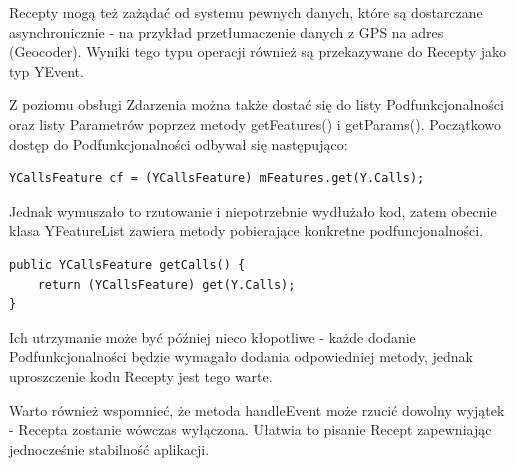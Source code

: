 \documentclass[11pt,a4paper,polish,thesis]{dcsbook}
\begin{document}
Recepty mogą też zażądać od systemu pewnych danych, które są dostarczane asynchronicznie - na przykład przetłumaczenie danych z GPS na adres (Geocoder). Wyniki tego typu operacji również są przekazywane do Recepty jako typ YEvent.

Z poziomu obsługi Zdarzenia można także dostać się do listy Podfunkcjonalności oraz listy Parametrów poprzez metody getFeatures() i getParams(). Początkowo dostęp do Podfunkcjonalności odbywał się następująco:
\begin{verbatim}
YCallsFeature cf = (YCallsFeature) mFeatures.get(Y.Calls);
\end{verbatim}
Jednak wymuszało to rzutowanie i niepotrzebnie wydłużało kod, zatem obecnie klasa YFeatureList zawiera metody pobierające konkretne podfuncjonalności.
\begin{verbatim}
public YCallsFeature getCalls() {
    return (YCallsFeature) get(Y.Calls);
}
\end{verbatim}
Ich utrzymanie może być później nieco kłopotliwe - każde dodanie Podfunkcjonalności będzie wymagało dodania odpowiedniej metody, jednak uproszczenie kodu Recepty jest tego warte.

Warto również wspomnieć, że metoda handleEvent może rzucić dowolny wyjątek - Recepta zostanie wówczas wyłączona. Ułatwia to pisanie Recept zapewniając jednocześnie stabilność aplikacji.
\end{document}
